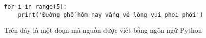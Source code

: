 \documentclass{article}
\begin{document}
\begin{lstlisting}
for i in range(5):
    print('Đường phố hôm nay vắng vẻ lòng vui phơi phới')
\end{lstlisting}


Trên đây là một đoạn mã nguồn được viết bằng ngôn ngữ Python
\end{document}
